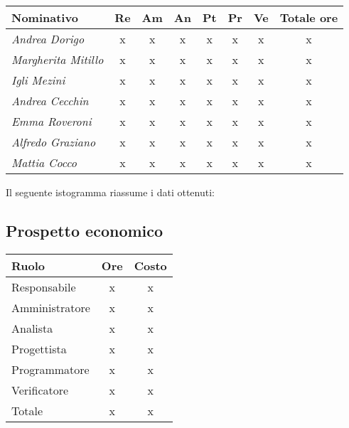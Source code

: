 {{{{{{{{{	\begin{center}
		\renewcommand{\arraystretch}{1.4}
		\begin{tabularx}{\textwidth}{|X|c|c|c|c|c|c|c|}
			\hline
			\rowcolor{airforceblue}
			\textbf{Nominativo} & \textbf{Re} & \textbf{Am} & \textbf{An} & \textbf{Pt} & \textbf{Pr} & \textbf{Ve} & \textbf{Totale ore}\\
			\hline
			\textit{Andrea Dorigo} & x & x & x & x & x & x & x\\
			\hline
			\textit{Margherita Mitillo} & x & x & x & x & x & x & x\\
			\hline
			\textit{Igli Mezini} & x & x & x & x & x & x & x\\
			\hline
			\textit{Andrea Cecchin} & x & x & x & x & x & x & x\\
			\hline
			\textit{Emma Roveroni} & x & x & x & x & x & x & x\\
			\hline
			\textit{Alfredo Graziano} & x & x & x & x & x & x & x\\
			\hline
			\textit{Mattia Cocco} & x & x & x & x & x & x & x\\
			\hline
		\end{tabularx}
	\end{center}

Il seguente istogramma riassume i dati ottenuti:

\subsection{Prospetto economico}\label{5.5.2}
\quad
\def\tabularxcolumn#1{m{#1}}
{	
	\begin{center}
		\renewcommand{\arraystretch}{1.4}
		\begin{tabularx}{7cm}{|X|c|c|}
			\hline
			\rowcolor{airforceblue}
			\textbf{Ruolo} & \textbf{Ore} & \textbf{Costo}\\
			\hline
			Responsabile & x & x\\
			\hline
			Amministratore & x & x\\
			\hline
			Analista & x & x\\
			\hline
			Progettista & x & x\\
			\hline
			Programmatore & x & x\\
			\hline
			Verificatore & x & x\\
			\hline
			Totale & x & x\\
			\hline
		\end{tabularx}
	\end{center}

}}}}}}}}}}
